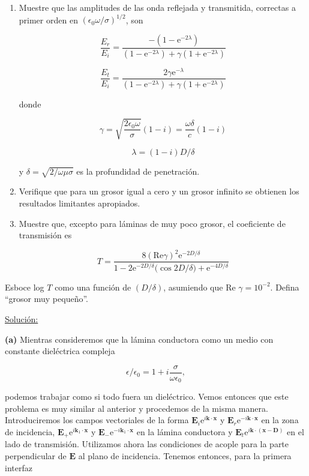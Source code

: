 \documentclass[a4paper,11pt]{article}
\numberwithin{equation}{section}
\newcommand{\euler}{\mathrm{e}}
\begin{document}
\begin{enumerate}[label=\textbf{(\alph*)}]
 \item Muestre que las amplitudes de las onda reflejada y transmitida, correctas 
 a primer orden en $(\epsilon_0 \omega /\sigma)^{1/2}$, son 
 
 $$
 \frac{E_r}{E_i} = \frac{-(1 - \euler^{-2\lambda})}{(1 - \euler^{-2\lambda}) 
 + \gamma(1 + \euler^{-2\lambda})}
 $$
 
  $$
 \frac{E_t}{E_i} = \frac{2\gamma \euler^{-\lambda}}{(1 - \euler^{-2\lambda}) 
 + \gamma(1 + \euler^{-2\lambda})}
 $$
 
 donde 
 
 $$
 \gamma = \sqrt{\frac{2\epsilon_0 \omega}{\sigma}}(1 - i) = \frac{\omega \delta}{c}
 (1 - i)
 $$
 
 $$
 \lambda = (1-i)D/\delta
 $$
 
  y $\delta = \sqrt{2/\omega \mu \sigma}$ es la profundidad de penetración.
 
 \item Verifique que para un grosor igual a cero y un grosor infinito se obtienen 
 los resultados limitantes apropiados.
 \item Muestre que, excepto para láminas de muy poco grosor, el coeficiente de 
 transmisión es 
 
 $$
 T = \frac{8(\text{Re} \gamma)^2 \euler^{-2D/\delta}}{1 - 2\euler^{-2D/\delta} 
 (\cos{2D/\delta) + \euler^{-4D/\delta}}}
 $$
\end{enumerate}

Esboce log $T$ como una función de $(D/\delta)$, asumiendo que Re $\gamma = 10^{-2}$. 
Defina ``grosor muy pequeño''.

\vspace{.3cm}

\underline{Solución:} \vspace{.3cm}

\textbf{(a)} Mientras consideremos que la lámina conductora como un medio con 
constante dieléctrica compleja 

\begin{equation}
 \epsilon/\epsilon_0 = 1 + i\frac{\sigma}{\omega \epsilon_0},
\end{equation}

podemos trabajar como si todo fuera un dieléctrico. Vemos entonces que este problema 
es muy similar al anterior y procedemos de la misma manera. Introduciremos los 
campos vectoriales de la forma $\mathbf{E}_i \euler^{i\mathbf{k} \cdot \mathbf{x}}$ 
y $\mathbf{E}_r \euler^{- i\mathbf{k} \cdot \mathbf{x}}$ en la zona de incidencia, 
$\mathbf{E}_+ \euler^{i\mathbf{k}_1 \cdot \mathbf{x}}$ y 
$\mathbf{E}_- \euler^{-i\mathbf{k}_1 \cdot \mathbf{x}}$ en la lámina conductora y 
$\mathbf{E}_t \euler^{i\mathbf{k} \cdot (\mathbf{x} - \mathbf{D})}$ en el lado 
de transmisión. Utilizamos ahora las condiciones de acople para la parte perpendicular 
de $\mathbf{E}$ al plano de incidencia. Tenemos entonces, para la primera interfaz 
\end{document}
